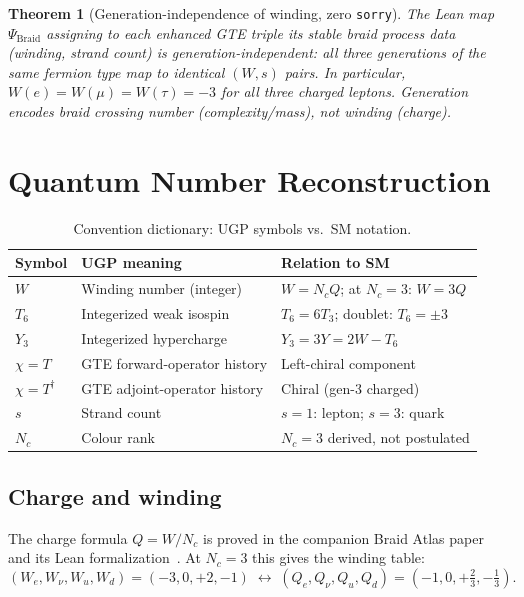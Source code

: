 \documentclass[12pt]{article}
\newtheorem{theorem}{Theorem}[section]
\theoremstyle{remark}
\newcommand{\sorry}{\texttt{sorry}}
\begin{document}
\begin{theorem}[Generation-independence of winding, zero \sorry]
\label{thm:gen-ind}
The Lean map $\Psi_\mathrm{Braid}$ assigning to each enhanced GTE triple its
stable braid process data (winding, strand count) is generation-independent:
all three generations of the same fermion type map to identical
$(W, s)$ pairs.  In particular, $W(e) = W(\mu) = W(\tau) = -3$ for all three
charged leptons.  Generation encodes braid crossing number (complexity/mass),
not winding (charge).
\end{theorem}

\section{Quantum Number Reconstruction}
\label{sec:qnumbers}

\begin{table}[h]
\centering\small
\caption{Convention dictionary: UGP symbols vs.\ SM notation.}
\label{tab:conventions}
\begin{tabular}{lll}
\toprule
\textbf{Symbol} & \textbf{UGP meaning} & \textbf{Relation to SM} \\
\midrule
$W$ & Winding number (integer) & $W = N_c Q$; at $N_c=3$: $W = 3Q$ \\
$T_6$ & Integerized weak isospin & $T_6 = 6T_3$; doublet: $T_6 = \pm 3$ \\
$Y_3$ & Integerized hypercharge & $Y_3 = 3Y = 2W - T_6$ \\
$\chi = T$ & GTE forward-operator history & Left-chiral component \\
$\chi = T^\dagger$ & GTE adjoint-operator history & Chiral (gen-3 charged) \\
$s$ & Strand count & $s=1$: lepton; $s=3$: quark \\
$N_c$ & Colour rank & $N_c = 3$ derived, not postulated \\
\bottomrule
\end{tabular}
\end{table}

\subsection{Charge and winding}

The charge formula $Q = W/N_c$ is proved in the companion Braid Atlas
paper~\cite{ugp-p17} and its Lean formalization~\cite{ugp-lean}.  At $N_c = 3$
this gives the winding table:
\begin{equation}
  (W_e, W_\nu, W_u, W_d) = (-3, 0, +2, -1)
  \;\leftrightarrow\;
  (Q_e, Q_\nu, Q_u, Q_d) = (-1, 0, +\tfrac{2}{3}, -\tfrac{1}{3}).
\end{equation}
\end{document}
